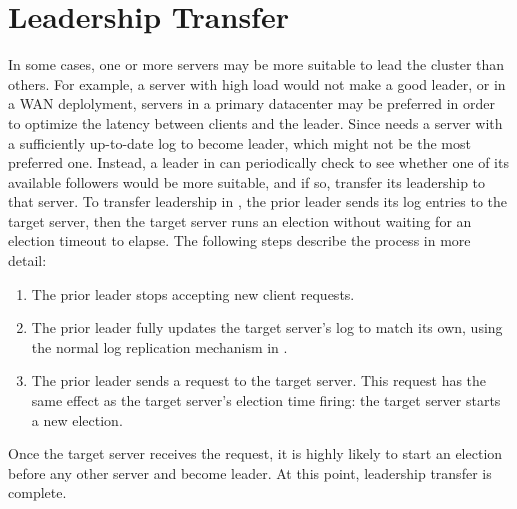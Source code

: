 \section{Leadership Transfer} \label{sec:leadership}

In some cases, one or more servers may be more suitable to lead the cluster than others. For 
example, a server with high load would not make a good leader, or in a WAN deplolyment, 
servers in a primary datacenter may be preferred in order to optimize the latency between clients 
and the leader. Since \smrsystem needs a server with a sufficiently up-to-date log to become leader, 
which might not be the most preferred one. Instead, a leader in \xxx can periodically check 
to see whether one of its available followers would be more suitable, and if so, transfer its 
leadership to that server.
To transfer leadership in \xxx, the prior leader sends its log entries to the target server, then 
the target server runs an election without waiting for an election timeout to elapse. The following 
steps describe the process in more detail:

\begin{enumerate}
\item The prior leader stops accepting new client requests.
\item The prior leader fully updates the target server's log to match its own, using the normal log 
replication mechanism in \smrsystem.
\item The prior leader sends a \timeoutnow request to the target server. This request has the same effect as 
the target server's election time firing: the target server starts a new election.
\end{enumerate}

Once the target server receives the \timeoutnow request, it is highly likely to start an election before 
any other server and become leader. At this point, leadership transfer is complete.

